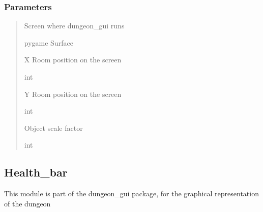 \documentclass[letterpaper,10pt,english]{sphinxmanual}
\begin{document}
\begin{fulllineitems}
\begin{fulllineitems}
\subsubsection{Parameters}
\label{\detokenize{api_reference/dungeon_gui/Enemy:parameters}}\begin{quote}\begin{description}
\sphinxAtStartPar
Screen where dungeon\_gui runs

\sphinxAtStartPar
pygame Surface

\sphinxAtStartPar
X Room position on the screen

\sphinxAtStartPar
int

\sphinxAtStartPar
Y Room position on the screen

\sphinxAtStartPar
int

\sphinxAtStartPar
Object scale factor

\sphinxAtStartPar
int

\end{description}\end{quote}

\end{fulllineitems}


\end{fulllineitems}


\sphinxstepscope


\subsection{Health\_bar}
\label{\detokenize{api_reference/dungeon_gui/health_bar:module-health_bar}}\label{\detokenize{api_reference/dungeon_gui/health_bar:health-bar}}\label{\detokenize{api_reference/dungeon_gui/health_bar::doc}}
\sphinxAtStartPar
This module is part of the dungeon\_gui package, for the graphical representation of the dungeon
\end{document}
